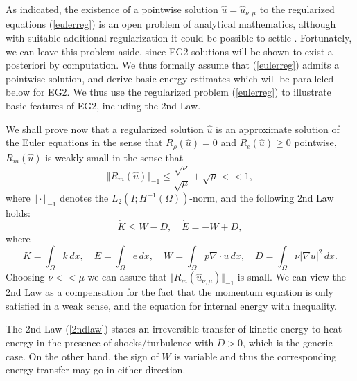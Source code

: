 As indicated, the existence of a pointwise solution 
$\hat u=\hat u_{\nu ,\mu}$ to the regularized equations (\ref{eulerreg})
is an open problem of analytical mathematics, 
although with suitable additional regularization it could
be possible to settle \cite{feireisl}. Fortunately, we can leave this
problem aside, since EG2 solutions will be shown to exist a posteriori 
by computation. We thus formally assume that (\ref{eulerreg}) admits a 
pointwise solution, and derive basic energy estimates which
will be paralleled below for EG2.  We thus use the regularized problem 
(\ref{eulerreg}) to illustrate basic features of EG2, including
the 2nd Law.       


We shall prove now that a regularized solution 
$\hat u$ is an approximate solution of the Euler equations 
in the sense that $R_\rho (\hat u)=0$ and $R_e(\hat u)\ge 0$ pointwise,
$R_m(\hat u)$ is weakly small in the sense that 
\begin{equation}\label{euler1dweak}
\Vert R_m(\hat u)\Vert_{-1}\le 
\frac{\sqrt{\nu}}{\sqrt{\mu}}+\sqrt{\mu}<<1,
\end{equation}
where $\Vert\cdot\Vert_{-1}$ denotes the $L_2(I;H^{-1}(\Omega ))$-norm,
and the following 2nd Law holds:
\begin{equation}\label{2ndlaw}
\dot K \le W-D,\quad \dot E =-W+D,
\end{equation}
where 
\[
K=\int_\Omega k\, dx,\quad E=\int_\Omega e\, dx, \quad W
=\int_\Omega p\nabla\cdot u\, dx, 
\quad D =\int_\Omega \nu \vert\nabla u\vert^2\, dx.
\]
Choosing $\nu << \mu$ we can assure that
$\Vert R_m(\hat u_{\nu ,\mu})\Vert_{-1}$ is small. We can view
the 2nd Law as a compensation for the fact that the momentum
equation is only satisfied in a weak sense, and the equation 
for internal energy with inequality. 

The 2nd Law (\ref{2ndlaw}) states an irreversible
transfer of kinetic energy to heat energy in the presence of  
shocks/turbulence with $D >0$, which is the generic case. 
On the other hand, the sign of $W$ is variable and
thus the corresponding energy transfer may go in either direction. 

